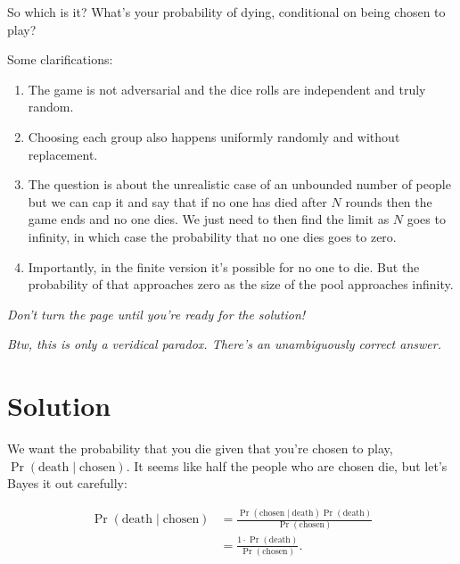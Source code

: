 \documentclass[article,twocolumn]{memoir}
\begin{document}
\vspace{2em}

So which is it? 
What's your probability of dying, conditional on being chosen to play?

\newpage

Some clarifications:

\begin{enumerate}
\item The game is not adversarial and the dice rolls are independent and truly random.
\item Choosing each group also happens uniformly randomly and without replacement.
\item The question is about the unrealistic case of an unbounded number of people but we can cap it and say that if no one has died after $N$ rounds then the game ends and no one dies. 
We just need to then find the limit as $N$ goes to infinity, in which case the probability that no one dies goes to zero.
\item Importantly, in the finite version it's possible for no one to die. 
But the probability of that approaches zero as the size of the pool approaches infinity.
\end{enumerate}

\vspace{2em}
\noindent
\emph{Don't turn the page until you're ready for the solution!}

\vfill

\vspace{2em}
\noindent
\emph{Btw, this is only a veridical paradox. There's an unambiguously correct answer.}

\newpage

\chapter*{Solution}

We want the probability that you die given that you're chosen to play, 
$\Pr(\text{death} \mid \text{chosen})$.
It seems like half the people who are chosen die, but let's Bayes it out carefully:

\begin{equation*}
\begin{split}
\Pr(\text{death} \mid \text{chosen}) & =
\frac{\Pr(\text{chosen} \mid \text{death}) \Pr(\text{death})}{\Pr(\text{chosen})} \\
& = \frac{1\cdot\Pr(\text{death})}{\Pr(\text{chosen})}.
\end{split}
\end{equation*}
\end{document}
